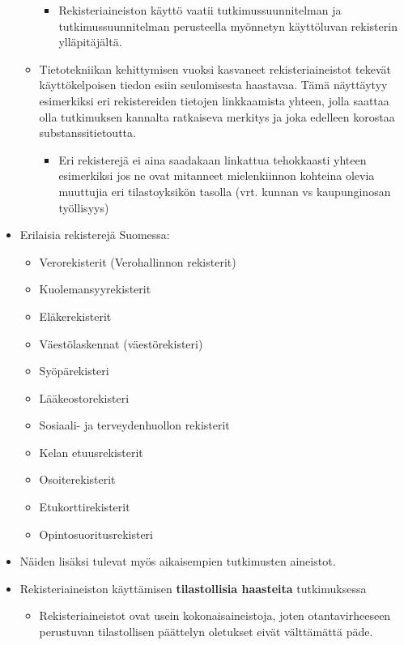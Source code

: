 \documentclass[
]{book}
\providecommand{\tightlist}{%
  \setlength{\itemsep}{0pt}\setlength{\parskip}{0pt}}
\begin{document}
\begin{itemize}
\begin{itemize}
    \begin{itemize}
    \tightlist
    \item
      Rekisteriaineiston käyttö vaatii tutkimussuunnitelman ja tutkimussuunnitelman perusteella myönnetyn käyttöluvan rekisterin ylläpitäjältä.
    \end{itemize}
  \item
    Tietotekniikan kehittymisen vuoksi kasvaneet rekisteriaineistot tekevät käyttökelpoisen tiedon esiin seulomisesta haastavaa. Tämä näyttäytyy esimerkiksi eri rekistereiden tietojen linkkaamista yhteen, jolla saattaa olla tutkimuksen kannalta ratkaiseva merkitys ja joka edelleen korostaa substanssitietoutta.

    \begin{itemize}
    \tightlist
    \item
      Eri rekisterejä ei aina saadakaan linkattua tehokkaasti yhteen esimerkiksi jos ne ovat mitanneet mielenkiinnon kohteina olevia muuttujia eri tilastoyksikön tasolla (vrt. kunnan vs kaupunginosan työllisyys)
    \end{itemize}
  \end{itemize}
\item
  Erilaisia rekisterejä Suomessa:

  \begin{itemize}
  \tightlist
  \item
    Verorekisterit (Verohallinnon rekisterit)
  \item
    Kuolemansyyrekisterit
  \item
    Eläkerekisterit
  \item
    Väestölaskennat (väestörekisteri)
  \item
    Syöpärekisteri
  \item
    Lääkeostorekisteri
  \item
    Sosiaali- ja terveydenhuollon rekisterit
  \item
    Kelan etuusrekisterit
  \item
    Osoiterekisterit
  \item
    Etukorttirekisterit
  \item
    Opintosuoritusrekisteri
  \end{itemize}
\item
  Näiden lisäksi tulevat myös aikaisempien tutkimusten aineistot.
\item
  Rekisteriaineiston käyttämisen \textbf{tilastollisia haasteita} tutkimuksessa

  \begin{itemize}
  \tightlist
  \item
    Rekisteriaineistot ovat usein kokonaisaineistoja, joten otantavirheeseen perustuvan tilastollisen päättelyn oletukset eivät välttämättä päde.


\end{itemize}
\end{itemize}
\end{document}
